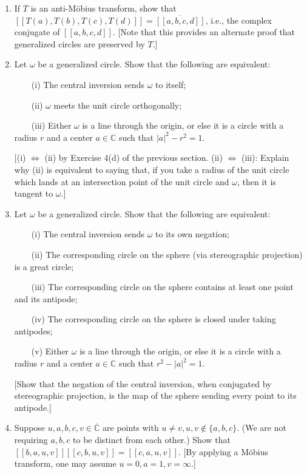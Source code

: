 \documentclass[leqno]{book}
\begin{document}
\begin{enumerate}
\item If $T$ is an anti-M\"obius transform, show that $[\![T(a),T(b),T(c),T(d)]\!]=\overline{[\![a,b,c,d]\!]}$, i.e., the complex conjugate of $[\![a,b,c,d]\!]$.  [Note that this provides an alternate proof that generalized circles are preserved by $T$.]

\item Let $\omega$ be a generalized circle.  Show that the following are equivalent:

~~~~(i) The central inversion sends $\omega$ to itself;

~~~~(ii) $\omega$ meets the unit circle orthogonally;

~~~~(iii) Either $\omega$ is a line through the origin, or else it is a circle with a radius $r$ and a center $a\in\mathbb C$ such that $|a|^2-r^2=1$.

[(i) $\iff$ (ii) by Exercise 4(d) of the previous section.  (ii) $\iff$ (iii): Explain why (ii) is equivalent to saying that, if you take a radius of the unit circle which lands at an intersection point of the unit circle and $\omega$, then it is tangent to $\omega$.]

\item Let $\omega$ be a generalized circle.  Show that the following are equivalent:

~~~~(i) The central inversion sends $\omega$ to its own negation;

~~~~(ii) The corresponding circle on the sphere (via stereographic projection) is a great circle;

~~~~(iii) The corresponding circle on the sphere contains at least one point and its antipode;

~~~~(iv) The corresponding circle on the sphere is closed under taking antipodes;

~~~~(v) Either $\omega$ is a line through the origin, or else it is a circle with a radius $r$ and a center $a\in\mathbb C$ such that $r^2-|a|^2=1$.

[Show that the negation of the central inversion, when conjugated by stereographic projection, is the map of the sphere sending every point to its antipode.]

\item Suppose $u,a,b,c,v\in\overline{\mathbb C}$ are points with $u\ne v,u,v\notin\{a,b,c\}$.  (We are not requiring $a,b,c$ to be distinct from each other.) %
Show that $[\![b,a,u,v]\!][\![c,b,u,v]\!]=[\![c,a,u,v]\!]$.  [By applying a M\"obius transform, one may assume $u=0,a=1,v=\infty$.]


\end{enumerate}
\end{document}
